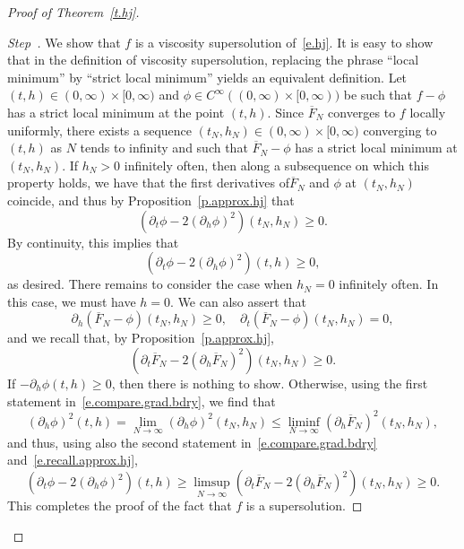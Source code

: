 \documentclass[10pt]{amsart}
\theoremstyle{definition}\newtheorem{defi}[theo]{Definition}\newtheorem{rema}[theo]{Remark}\newtheorem{exam}[theo]{Example}\newtheorem{exem}[theo]{Example}\newtheorem{nota}[theo]{Notation}
\newcommand{\1}{\mathds{1}}
\renewcommand{\le}{\leqslant}
\renewcommand{\ge}{\geqslant}
\renewcommand{\bar}{\overline}
\newcounter{stepcount}
\newenvironment{step}{\refstepcounter{stepcount}\begin{proof}[Step~\thestepcount]}{\let\qed\relax\end{proof}}
\begin{document}
\begin{proof}[Proof of Theorem~\ref{t.hj}]
\setcounter{stepcount}{0}
\begin{step}\label{prooftheo2.1step1}
We show that $f$ is a viscosity supersolution of~\eqref{e.hj}. It is easy to show that in the definition of viscosity supersolution, replacing the phrase ``local minimum'' by ``strict local minimum'' yields an equivalent definition. Let $(t,h) \in (0,\infty)\times [0,\infty)$ and $\phi \in C^\infty((0,\infty)\times [0,\infty))$ be such that $f-\phi$ has a strict local minimum at the point $(t,h)$. Since $\bar F_N$ converges to $f$ locally uniformly, there exists a sequence $(t_N,h_N) \in (0,\infty)\times [0,\infty)$ converging to $(t,h)$ as $N$ tends to infinity and such that $\bar F_N - \phi$ has a strict local minimum at $(t_N,h_N)$. If $h_N > 0$ infinitely often, then along a subsequence on which this property holds, we have that the first derivatives of\linebreak$\bar F_N$ and $\phi$ at $(t_N,h_N)$ coincide, and thus by Proposition~\ref{p.approx.hj} that
\[
\left(\partial_t \phi - 2 (\partial_h \phi)^2 \right)(t_N,h_N) \ge 0.
\]
By continuity, this implies that
\[
\left(\partial_t \phi - 2 (\partial_h \phi)^2 \right)(t,h) \ge 0,
\]
as desired. There remains to consider the case when $h_N = 0$ infinitely often. In this case, we must have $h = 0$. We can also assert that
\begin{equation}\label{e.compare.grad.bdry}
\partial_h \left(\bar F_N - \phi\right)(t_N,h_N) \ge 0, \quad \partial_t \left(\bar F_N - \phi\right)(t_N,h_N) = 0,
\end{equation}
and we recall that, by Proposition~\ref{p.approx.hj},
\begin{equation}\label{e.recall.approx.hj}
\left(\partial_t \bar F_N - 2 \left(\partial_h \bar F_N\right)^2 \right)(t_N,h_N) \ge 0.
\end{equation}
If $-\partial_h\phi(t,h) \ge 0$, then there is nothing to show. Otherwise, using the first statement in~\eqref{e.compare.grad.bdry}, we find that
\[
(\partial_h \phi)^2(t,h) = \lim_{N \to \infty} (\partial_h \phi)^2(t_N,h_N) \le \liminf_{N \to \infty} \left(\partial_h \bar F_N\right)^2(t_N,h_N),
\]
and thus, using also the second statement in~\eqref{e.compare.grad.bdry} and~\eqref{e.recall.approx.hj},
\[
\left(\partial_t \phi - 2 (\partial_h \phi)^2 \right)(t,h) \ge \limsup_{N\to \infty} \left(\partial_t \bar F_N - 2 \left(\partial_h \bar F_N\right)^2 \right)(t_N,h_N) \ge 0.
\]
This completes the proof of the fact that $f$ is a supersolution.
\end{step}


\end{proof}
\end{document}
